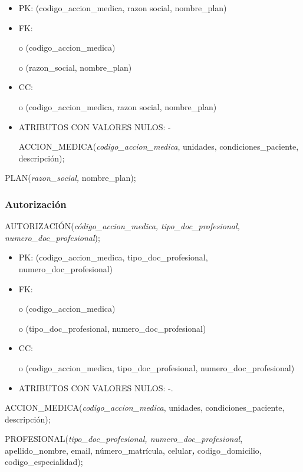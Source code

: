 \documentclass[a4paper,11pt]{article}
\begin{document}
\begin{itemize}
\item PK: (codigo\_accion\_medica, razon social, nombre\_plan)

\item FK: 

o (codigo\_accion\_medica)

o (razon\_social,  nombre\_plan)

\item CC:

o (codigo\_accion\_medica, razon social, nombre\_plan)

\item ATRIBUTOS CON VALORES NULOS:  -

ACCION\_MEDICA(\emph{codigo\_accion\_medica}, unidades, condiciones\_paciente, 
descripción);
\end{itemize}

PLAN(\emph{razon\_social, }nombre\_plan);\label{HToc293405847}

\subsubsection{\textbf{Autorización}}

AUTORIZACIÓN(\emph{código\_accion\_medica, tipo\_doc\_profesional, numero\_doc\_profesional});

\begin{itemize}
\item PK: (codigo\_accion\_medica, tipo\_doc\_profesional, numero\_doc\_profesional)

\item FK: 

o (codigo\_accion\_medica)

o (tipo\_doc\_profesional, numero\_doc\_profesional)

\item CC:

o (codigo\_accion\_medica, tipo\_doc\_profesional, numero\_doc\_profesional)

\item ATRIBUTOS CON VALORES NULOS:  -.
\end{itemize}

ACCION\_MEDICA(\emph{codigo\_accion\_medica}, unidades, condiciones\_paciente, 
descripción);

PROFESIONAL(\emph{tipo\_doc\_profesional, numero\_doc\_profesional}, apellido\_nombre, 
email, número\_matrícula, celular\textit{\textbf{, }}codigo\_domicilio, codigo\_especialidad);\label{HToc293405848}
\end{document}
